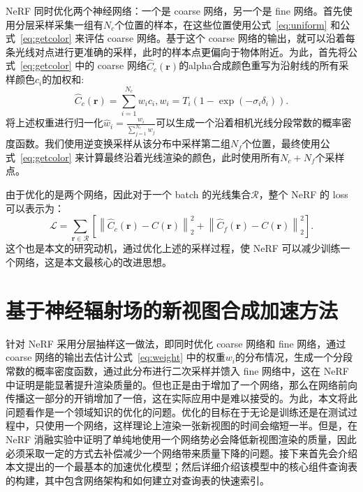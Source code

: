 NeRF 同时优化两个神经网络：一个是 coarse 网络，另一个是 fine 网络。首先使用分层采样采集一组有$N_c$个位置的样本，在这些位置使用公式~\ref{eq:uniform} 和公式~\ref{eq:getcolor} 来评估 coarse 网络。基于这个 coarse 网络的输出，就可以沿着每条光线对点进行更准确的采样，此时的样本点更偏向于物体附近。为此，首先将公式~\ref{eq:getcolor} 中的 coarse 网络$\displaystyle \hat{C}_{c} \left(\symbf{r}\right)$的alpha合成颜色重写为沿射线的所有采样颜色$\displaystyle c_i$的加权和:
\begin{equation}
    \hat{C}_{c}\left(\symbf{r}\right) = \sum_{i=1}^{N_c}w_{i}c_{i}, w_{i} = T_{i}\left(1 - \exp \left(-\sigma_{i}\delta_{i}\right)\right).
    \label{eq:weight}
\end{equation}
将上述权重进行归一化$\displaystyle \hat{w}_{i} = \frac{w_i}{\sum_{j=1}^{N_c}w_j}$可以生成一个沿着相机光线分段常数的概率密度函数。我们使用逆变换采样从该分布中采样第二组$\displaystyle N_f$个位置，最终使用公式~\ref{eq:getcolor} 来计算最终沿着光线渲染的颜色，此时使用所有$\displaystyle N_c + N_f$个采样点。

由于优化的是两个网络，因此对于一个 batch 的光线集合$\mathcal{R}$，整个 NeRF 的 loss 可以表示为：
\begin{equation}
    \mathcal{L} = \sum_{\symbf{r}\in \mathcal{R}}\left[\left\|\hat{C}_{c}\left(\symbf{r}\right) - C\left(\symbf{r}\right)\right\|_{2}^{2} + \left\|\hat{C}_{f}\left(\symbf{r}\right) - C\left(\symbf{r}\right)\right\|_{2}^{2} \right].
    \label{eq:nerf_loss}
\end{equation}
这个也是本文的研究动机，通过优化上述的采样过程，使 NeRF 可以减少训练一个网络，这是本文最核心的改进思想。

\section{基于神经辐射场的新视图合成加速方法}\label{method}
针对 NeRF 采用分层抽样这一做法，即同时优化 coarse 网络和 fine 网络，通过 coarse 网络的输出去估计公式~\ref{eq:weight} 中的权重$\displaystyle w_i$的分布情况，生成一个分段常数的概率密度函数，通过此分布进行二次采样并馈入 fine 网络中，这在 NeRF 中证明是能显著提升渲染质量的。但也正是由于增加了一个网络，那么在网络前向传播这一部分的开销增加了一倍，这在实际应用中是难以接受的。为此，本文将此问题看作是一个领域知识的优化的问题。优化的目标在于无论是训练还是在测试过程中，只使用一个网络，这样理论上渲染一张新视图的时间会缩短一半。但是，在 NeRF 消融实验中证明了单纯地使用一个网络势必会降低新视图渲染的质量，因此必须采取一定的方式去补偿减少一个网络带来质量下降的问题。接下来首先会介绍本文提出的一个最基本的加速优化模型；然后详细介绍该模型中的核心组件查询表的构建，其中包含网络架构和如何建立对查询表的快速索引。

